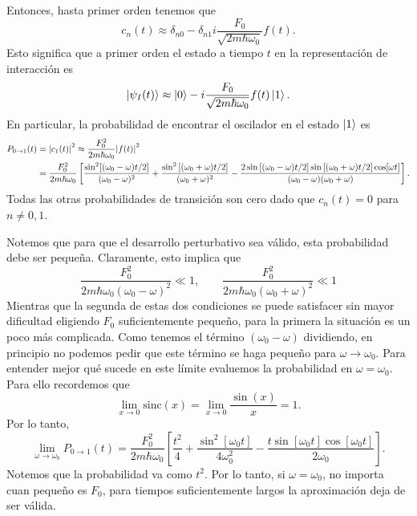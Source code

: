 \documentclass[10pt, a4paper]{article}
\newcommand{\sinc}{\text{sinc}}
\numberwithin{equation}{subsection}
\begin{document}
Entonces, hasta primer orden tenemos que
\begin{equation}
  c_n(t) \approx \delta_{n0} -
    \delta_{n1}i\frac{F_0}{\sqrt{2m\hbar\omega_0}}f(t).
\end{equation}
Esto significa que a primer orden el estado a tiempo $t$ en la representación
de interacción es
\begin{equation} \label{exc:osc:stateevol}
  \ket{\psi_I(t)} \approx \ket{0} -
  i\frac{F_0}{\sqrt{2m\hbar\omega_0}}f(t)\ket{1}.
\end{equation}
En particular, la probabilidad de encontrar el oscilador en el estado $\ket{1}$ es
\begin{align}
  P_{0 \to 1}(t)
  &= \abs{c_1(t)}^2
  \approx \frac{F_0^2}{2m\hbar\omega_0}\abs{f(t)}^2 \nonumber\\
  &= \frac{F_0^2}{2m\hbar\omega_0} \left[
    \frac{\sin^2[(\omega_0 - \omega)t/2]}
    {(\omega_0 - \omega)^2} + \frac{\sin^2\left[(\omega_0 +
    \omega)t/2\right]} {(\omega_0 + \omega)^2} -
    \frac{2\sin\left[(\omega_0 - \omega)t/2\right]
    \sin\left[(\omega_0 + \omega)t/2\right] \cos[\omega t]}
    {(\omega_0 - \omega)(\omega_0 + \omega)} \right].
\end{align}
Todas las otras probabilidades de transición son cero dado que $c_n(t) = 0$
para $n \neq 0,1$.

Notemos que para que el desarrollo perturbativo sea válido, esta probabilidad
debe ser pequeña. Claramente, esto implica que
\begin{equation}
  \frac{F_0^2}{2m\hbar\omega_0(\omega_0 - \omega)^2} \ll 1, \qquad
  \frac{F_0^2}{2m\hbar\omega_0(\omega_0 + \omega)^2} \ll 1  
\end{equation}
Mientras que la segunda de estas dos condiciones se puede satisfacer sin mayor
dificultad eligiendo $F_0$ suficientemente pequeño, para la primera la situación
es un poco más complicada. Como tenemos el término $(\omega_0 - \omega)$
dividiendo, en principio no podemos pedir que este término se haga pequeño para
$\omega \to \omega_0$. Para entender mejor qué sucede en este límite evaluemos
la probabilidad en $\omega = \omega_0$. Para ello recordemos que
\begin{equation}
  \lim_{x \to 0}\sinc(x) = \lim_{x \to 0}\frac{\sin(x)}{x} = 1.
\end{equation}
Por lo tanto,
\begin{equation}
  \lim_{\omega \to \omega_0} P_{0 \to 1}(t)
  = \frac{F_0^2}{2m\hbar\omega_0} \left[
    \frac{t^2}{4} +
    \frac{\sin^2\left[\omega_0t\right]}{4\omega_0^2} -
    \frac{t\sin\left[\omega_0t\right] \cos[\omega_0t]}{2\omega_0} \right].
\end{equation}
Notemos que la probabilidad va como $t^2$. Por lo tanto, si $\omega =
\omega_0$, no importa cuan pequeño es $F_0$, para tiempos suficientemente
largos la aproximación deja de ser válida.
\end{document}
